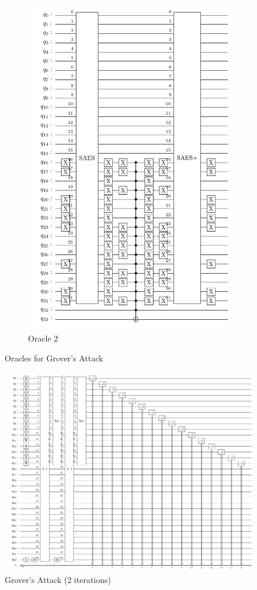 \documentclass[preprint]{transcrypto}
\begin{document}
\begin{figure}[h!]
\begin{subfigure}{.5\textwidth}
  \includegraphics[width=0.8\linewidth]{saes21/Uf2.pdf}
  \caption{Oracle 2}
  \label{fig:o221}
\end{subfigure}
\caption{Oracles for Grover's Attack}
\label{fig:test}
\end{figure}

\begin{figure}[h!]
    \centering
    \includegraphics[width=0.9\linewidth]{saes21/grover-2-iter.pdf}
    \caption{Grover's Attack (2 iterations)}
    \label{fig:grov21}
\end{figure}
\end{document}
